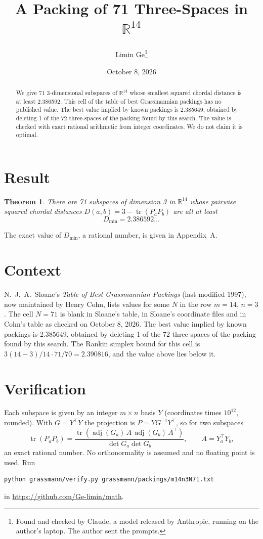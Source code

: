 \documentclass[11pt,a4paper]{article}
\title{A Packing of 71 Three-Spaces in $\mathbb{R}^{14}$}
\author{Limin Ge\thanks{Found and checked by Claude, a model released by Anthropic, running on the author's laptop. The author sent the prompts.}}
\date{October 8, 2026}
\newtheorem*{theorem}{Theorem}
\begin{document}
\maketitle
\begin{abstract}
We give 71 3-dimensional subspaces of $\mathbb{R}^{14}$ whose smallest squared chordal distance is at least 2.386592. This cell of the table of best Grassmannian packings has no published value. The best value implied by known packings is 2.385649, obtained by deleting 1 of the 72 three-spaces of the packing found by this search. The value is checked with exact rational arithmetic from integer coordinates. We do not claim it is optimal.
\end{abstract}

\section{Result}
\begin{theorem}
There are 71 subspaces of dimension 3 in $\mathbb{R}^{14}$ whose pairwise squared chordal distances $D(a,b) = 3 - \operatorname{tr}(P_aP_b)$ are all at least
\[ D_{\min} = 2.386592\ldots \]
\end{theorem}
The exact value of $D_{\min}$, a rational number, is given in Appendix~A.


\section{Context}
N.~J.~A.~Sloane's \emph{Table of Best Grassmannian Packings} (last modified 1997), now maintained by Henry Cohn, lists values for some $N$ in the row $m=14$, $n=3$. The cell $N=71$ is blank in Sloane's table, in Sloane's coordinate files and in Cohn's table as checked on October 8, 2026. The best value implied by known packings is 2.385649, obtained by deleting 1 of the 72 three-spaces of the packing found by this search. The Rankin simplex bound for this cell is $3(14-3)/14\cdot 71/70 = 2.390816$, and the value above lies below it.


\section{Verification}
Each subspace is given by an integer $m\times n$ basis $Y$ (coordinates times $10^{12}$, rounded). With $G=Y^\top Y$ the projection is $P=YG^{-1}Y^\top$, so for two subspaces
\[ \operatorname{tr}(P_aP_b)=\frac{\operatorname{tr}(\operatorname{adj}(G_a)\,A\,\operatorname{adj}(G_b)\,A^\top)}{\det G_a\det G_b},\qquad A=Y_a^\top Y_b, \]
an exact rational number. No orthonormality is assumed and no floating point is used. Run
\begin{verbatim}
python grassmann/verify.py grassmann/packings/m14n3N71.txt
\end{verbatim}
in \url{https://github.com/Ge-limin/math}.
\end{document}
